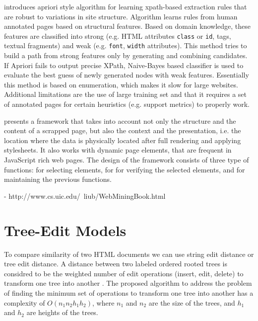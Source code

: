 \cite{DBLP:conf/icde/GulhaneMMRRSSTT11} introduces apriori style algorithm for learning xpath-based extraction rules that are robust to variations in site structure. Algorithm learns rules from human annotated pages based on structural features. Based on domain knowledge, these features are classified into strong (e.g. HTML attributes \texttt{class} or \texttt{id}, tags, textual fragments) and weak (e.g. \texttt{font}, \texttt{width} attributes). This method tries to build a path from strong features only by generating and combining candidates. If Apriori fails to output precise XPath, Naive-Bayes based classifier is used to evaluate the best guess of newly generated nodes with weak features. Essentially this method is based on enumeration, which makes it slow for large websites. Additional limitations are the use of large training set and that it requires a set of annotated pages for certain heuristics (e.g. support metrics) to properly work. 

\cite{Thomsen:2012:WWS:2364120.2364156} presents a framework that takes into account not only the structure and the content of a scrapped page, but also the context and the presentation, i.e. the location where the data is physically located after full rendering and applying stylesheets. It also works with dynamic page elements, that are frequent in JavaScript rich web pages. The design of the framework consists of three type of functions: for selecting elements, for for verifying the selected elements, and for maintaining the previous functions.

- http://www.cs.uic.edu/~liub/WebMiningBook.html\\


\section{Tree-Edit Models}

To compare similarity of two HTML documents we can use string edit distance or tree edit distance. A distance between two labeled ordered rooted trees is considred to be the weighted number of edit operations (insert, edit, delete) to transform one tree into another \cite{shasha1990a}. The proposed algorithm to address the problem of finding the minimum set of operations to transform one tree into another has a complexity of $O(n_1 n_2 h_1 h_2)$, where $n_1$ and $n_2$ are the size of the trees, and $h_1$ and $h_2$ are heights of the trees.

